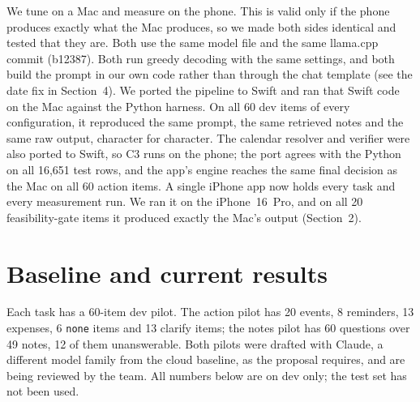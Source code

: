 \documentclass[10pt,letterpaper]{article}
\begin{document}
We tune on a Mac and measure on the phone. This is valid only if the phone produces exactly what the Mac produces, so we made both sides identical and tested that they are. Both use the same model file and the same llama.cpp commit (b12387). Both run greedy decoding with the same settings, and both build the prompt in our own code rather than through the chat template (see the date fix in Section~4). We ported the pipeline to Swift and ran that Swift code on the Mac against the Python harness. On all 60 dev items of every configuration, it reproduced the same prompt, the same retrieved notes and the same raw output, character for character. The calendar resolver and verifier were also ported to Swift, so C3 runs on the phone; the port agrees with the Python on all 16,651 test rows, and the app's engine reaches the same final decision as the Mac on all 60 action items. A single iPhone app now holds every task and every measurement run. We ran it on the iPhone~16~Pro, and on all 20 feasibility-gate items it produced exactly the Mac's output (Section~2).

\section{Baseline and current results}
Each task has a 60-item dev pilot. The action pilot has 20 events, 8 reminders, 13 expenses, 6 \texttt{none} items and 13 clarify items; the notes pilot has 60 questions over 49 notes, 12 of them unanswerable. Both pilots were drafted with Claude, a different model family from the cloud baseline, as the proposal requires, and are being reviewed by the team. All numbers below are on dev only; the test set has not been used.
\end{document}
